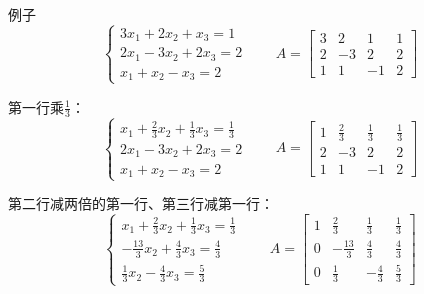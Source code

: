 \documentclass{beamer}
\begin{document}
\begin{frame}{例子}
    \begin{equation*}
        \left\{
            \begin{array}{l}
                3x_1 + 2x_2 + x_3 = 1\\
                2x_1 - 3x_2 + 2x_3 = 2\\
                x_1 + x_2 - x_3 = 2
            \end{array}
        \right. \qquad 
        A=\begin{bmatrix}
            3 & 2 & 1 & 1\\
            2 & -3 & 2 & 2\\
            1 & 1 & -1 & 2
        \end{bmatrix}
    \end{equation*}

    第一行乘$\frac{1}{3}$：
    \begin{equation*}
        \left\{
            \begin{array}{l}
                x_1 + \frac{2}{3}x_2 + \frac{1}{3}x_3 = \frac{1}{3}\\
                2x_1 - 3x_2 + 2x_3 = 2\\
                x_1 + x_2 - x_3 = 2
            \end{array}
        \right. \qquad 
        A=\begin{bmatrix}
            1 & \frac{2}{3} & \frac{1}{3} & \frac{1}{3}\\
            2 & -3 & 2 & 2\\
            1 & 1 & -1 & 2
        \end{bmatrix}
    \end{equation*}

    第二行减两倍的第一行、第三行减第一行：
    \begin{equation*}
        \left\{
            \begin{array}{l}
                x_1 + \frac{2}{3}x_2 + \frac{1}{3}x_3 = \frac{1}{3}\\
                - \frac{13}{3}x_2 + \frac{4}{3}x_3 = \frac{4}{3}\\
                \frac{1}{3}x_2 - \frac{4}{3}x_3 = \frac{5}{3}
            \end{array}
        \right. \qquad 
        A=\begin{bmatrix}
            1 & \frac{2}{3} & \frac{1}{3} & \frac{1}{3}\\
            0 & -\frac{13}{3} & \frac{4}{3} & \frac{4}{3}\\
            0 & \frac{1}{3} & -\frac{4}{3} & \frac{5}{3}
        \end{bmatrix}
    \end{equation*}
\end{frame}
\end{document}
